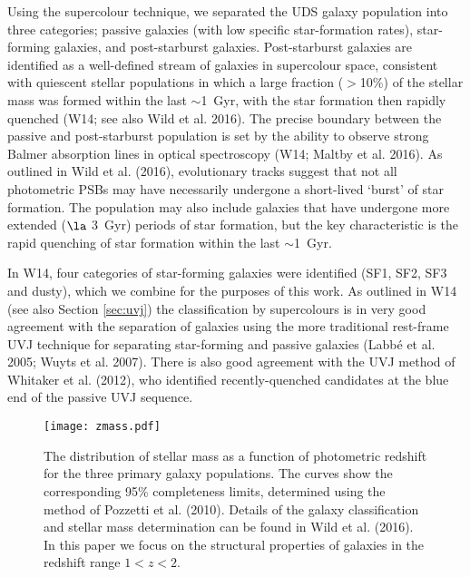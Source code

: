 \documentclass[a4paper,fleqn,usenatbib,useAMS]{mnras}
\begin{document}
Using the supercolour technique, we separated the UDS galaxy
population into three categories; passive galaxies (with low specific
star-formation rates), star-forming galaxies, and post-starburst
galaxies. Post-starburst galaxies are identified as a well-defined
stream of galaxies in supercolour space, consistent with quiescent
stellar populations in which a large fraction ($>$10\%) of the stellar
mass was formed within the last $\sim$1~Gyr, with the star formation
then rapidly quenched (W14; see also Wild et al. 2016). The precise
boundary between the passive and post-starburst population is set by
the ability to observe strong Balmer absorption lines in optical
spectroscopy (W14; Maltby et al. 2016). As outlined in Wild et
al. (2016), evolutionary tracks suggest that not all photometric PSBs
may have necessarily undergone a short-lived `burst' of star
formation.  The population may also include galaxies that have
undergone more extended ($\la$ 3~Gyr) periods of star formation, but
the key characteristic is the rapid quenching of star formation within
the last $\sim$1~Gyr.



In W14, four categories of star-forming galaxies were identified (SF1,
SF2, SF3 and dusty), which we combine for the purposes of this work.
As outlined in W14 (see also Section \ref{sec:uvj}) the classification by
supercolours is in very good agreement with the separation of galaxies
using the more traditional rest-frame UVJ technique for separating
star-forming and passive galaxies (Labb\'e et al. 2005; Wuyts et
al. 2007). There is also good agreement with the UVJ method of
Whitaker et al. (2012), who identified recently-quenched candidates at
the blue end of the passive UVJ sequence.


\begin{figure}
	\texttt{[image: zmass.pdf]}
    \caption{The distribution of stellar mass as a function of
      photometric redshift for the three primary galaxy
      populations. The curves show the corresponding 95\% completeness
      limits, determined using the method of Pozzetti et
      al. (2010). Details of the galaxy classification and stellar
      mass determination can be found in Wild et al. (2016). In this
      paper we focus on the structural properties of galaxies in the
      redshift range $1<z<2$.}
    \label{fig:zmass}
\end{figure}
\end{document}
